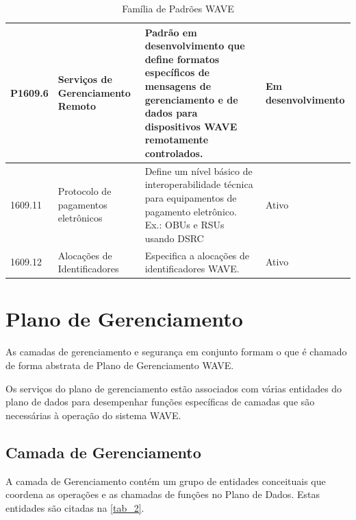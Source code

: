 \documentclass[
12pt,				%
openright,			%
oneside,			%
a4paper,			%
brazil,				%
]{abntex2}
\begin{document}
\begin{table}[H]
\begin{tabular}{|p{1.5cm}|p{2.3cm}|p{8.5cm}|p{2cm}|}
			P1609.6 & Serviços de Gerenciamento Remoto & Padrão em desenvolvimento que define formatos específicos de mensagens de gerenciamento e de dados para dispositivos WAVE remotamente controlados. & Em desenvolvimento \\ \hline
			1609.11 & Protocolo de pagamentos eletrônicos & Define um nível básico de interoperabilidade técnica para equipamentos de pagamento eletrônico. Ex.: OBUs e RSUs usando DSRC & Ativo \\ \hline
			1609.12 & Alocações de Identificadores & Especifica a alocações de identificadores WAVE. & Ativo \\ 
			\hline
		\end{tabular}
			\caption{\label{tab_1}Família de Padrões WAVE}
	\end{table}
	
	
	\section{Plano de Gerenciamento}
	\label{sec:PlanGere}
	
	\par As camadas de gerenciamento e segurança em conjunto formam o que é chamado de forma abstrata de Plano de Gerenciamento WAVE.
	
	\par Os serviços do plano de gerenciamento estão associados com várias entidades do plano de dados para desempenhar funções específicas de camadas que são necessárias à operação do sistema WAVE.
	
	\subsection{Camada de Gerenciamento}
	
	\par A camada de Gerenciamento contém um grupo de entidades conceituais que coordena as operações e as chamadas de funções no Plano de Dados. Estas entidades são citadas na \autoref{tab_2}.
		
\end{document}
